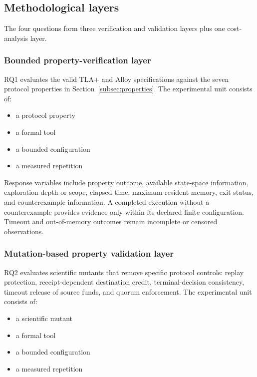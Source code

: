 \subsection{Methodological layers}
\label{subsec:methodological-layers}

The four questions form three verification and validation layers plus one
cost-analysis layer.

\subsubsection{Bounded property-verification layer}

RQ1 evaluates the valid TLA+ and Alloy specifications against the seven
protocol properties in Section~\ref{subsec:properties}. The experimental unit
consists of:

\begin{itemize}
\item a protocol property
\item a formal tool
\item a bounded configuration
\item a measured repetition
\end{itemize}

Response variables include property outcome, available state-space information,
exploration depth or scope, elapsed time, maximum resident memory, exit status,
and counterexample information. A completed execution without a counterexample
provides evidence only within its declared finite configuration. Timeout and
out-of-memory outcomes remain incomplete or censored observations.

\subsubsection{Mutation-based property validation layer}

RQ2 evaluates scientific mutants that remove specific protocol controls:
replay protection, receipt-dependent destination credit, terminal-decision
consistency, timeout release of source funds, and quorum enforcement. The
experimental unit consists of:

\begin{itemize}
\item a scientific mutant
\item a formal tool
\item a bounded configuration
\item a measured repetition
\end{itemize}

